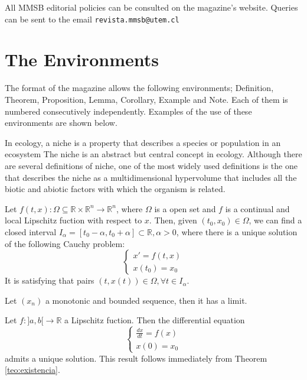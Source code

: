 \documentclass[eng]{MMSB-class-eng}
\begin{document}
All MMSB editorial policies can be consulted on the magazine's website. Queries can be sent to the email \texttt{revista.mmsb@utem.cl}


\section{The Environments}

The format of the magazine allows the following environments; Definition, Theorem, Proposition, Lemma, Corollary, Example and Note. Each of them is numbered consecutively independently. Examples of the use of these environments are shown below.\\

\begin{definition}
 In ecology, a niche is a property that describes a species or population in an ecosystem The niche is an abstract but central concept in ecology. Although there are several definitions of niche, one of the most widely used definitions is the one that describes the niche as a multidimensional hypervolume that includes all the biotic and abiotic factors with which the organism is related.
\end{definition}


\begin{theorem}\label{teo:existencia}
Let $f(t,x):\Omega \subseteq \mathbb {R} \times \mathbb {R} ^{n}\longrightarrow \mathbb {R} ^{n}$, where $\Omega$  is a open set and $f$ is a continual and local Lipschitz fuction with respect to $x$. Then, given $(t_{0},x_{0})\in \Omega$, we can find a closed interval $I_{\alpha }=[t_{0}-\alpha ,t_{0}+\alpha ]\subset \mathbb {R} ,\alpha >0$, where there is a unique solution of the following Cauchy problem:\\
\[
 {\displaystyle {\begin{cases}x'=f(t,x)\\x(t_{0})=x_{0}\end{cases}}}
\]
It is satisfying that pairs ${\displaystyle (t,x(t))\in \Omega ,\forall t\in I_{\alpha }}$.

\end{theorem}


\begin{proposition}
Let $(x_n)$ a monotonic and bounded sequence, then it has a limit.
\end{proposition}


\begin{corollary}
Let $f:]a,b[\to\mathbb{R}$ a Lipschitz fuction. Then the differential equation 
 \[
 {\displaystyle {\begin{cases}\frac{dx}{dt}=f(x)\\x(0)=x_{0}\end{cases}}}
\]
admits a unique solution. This result follows immediately from Theorem \ref{teo:existencia}.
\end{corollary}
\end{document}
